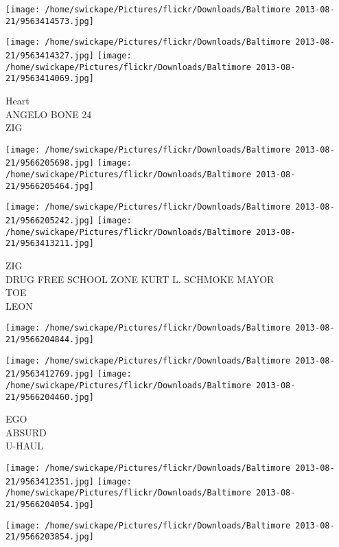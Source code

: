 \documentclass[10pt,letterpaper]{article}
\begin{document}
\texttt{[image: /home/swickape/Pictures/flickr/Downloads/Baltimore 2013-08-21/9563414573.jpg]}

\vspace{0.25in}
\texttt{[image: /home/swickape/Pictures/flickr/Downloads/Baltimore 2013-08-21/9563414327.jpg]}
\texttt{[image: /home/swickape/Pictures/flickr/Downloads/Baltimore 2013-08-21/9563414069.jpg]}

Heart\\
ANGELO BONE 24\\
ZIG\\
\pagebreak

\texttt{[image: /home/swickape/Pictures/flickr/Downloads/Baltimore 2013-08-21/9566205698.jpg]}
\texttt{[image: /home/swickape/Pictures/flickr/Downloads/Baltimore 2013-08-21/9566205464.jpg]}

\texttt{[image: /home/swickape/Pictures/flickr/Downloads/Baltimore 2013-08-21/9566205242.jpg]}
\texttt{[image: /home/swickape/Pictures/flickr/Downloads/Baltimore 2013-08-21/9563413211.jpg]}

ZIG\\
DRUG FREE SCHOOL ZONE KURT L. SCHMOKE MAYOR\\
TOE\\
LEON\\
\pagebreak

\texttt{[image: /home/swickape/Pictures/flickr/Downloads/Baltimore 2013-08-21/9566204844.jpg]}

\vspace{0.25in}
\texttt{[image: /home/swickape/Pictures/flickr/Downloads/Baltimore 2013-08-21/9563412769.jpg]}
\texttt{[image: /home/swickape/Pictures/flickr/Downloads/Baltimore 2013-08-21/9566204460.jpg]}

EGO\\
ABSURD\\
U{-}HAUL\\
\pagebreak

\texttt{[image: /home/swickape/Pictures/flickr/Downloads/Baltimore 2013-08-21/9563412351.jpg]}
\texttt{[image: /home/swickape/Pictures/flickr/Downloads/Baltimore 2013-08-21/9566204054.jpg]}

\vspace{0.25in}
\texttt{[image: /home/swickape/Pictures/flickr/Downloads/Baltimore 2013-08-21/9566203854.jpg]}
\end{document}
